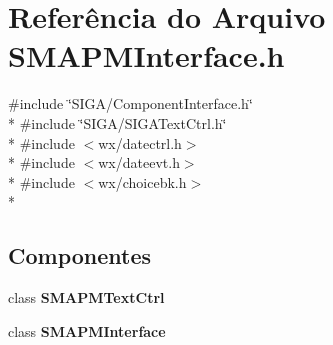 \section{Referência do Arquivo S\+M\+A\+P\+M\+Interface.\+h}
\label{_s_m_a_p_m_interface_8h}
{\ttfamily \#include \char`\"{}S\+I\+G\+A/\+Component\+Interface.\+h\char`\"{}}\\*
{\ttfamily \#include \char`\"{}S\+I\+G\+A/\+S\+I\+G\+A\+Text\+Ctrl.\+h\char`\"{}}\\*
{\ttfamily \#include $<$wx/datectrl.\+h$>$}\\*
{\ttfamily \#include $<$wx/dateevt.\+h$>$}\\*
{\ttfamily \#include $<$wx/choicebk.\+h$>$}\\*
\subsection*{Componentes}
\begin{DoxyCompactItemize}
\item 
class {\bf S\+M\+A\+P\+M\+Text\+Ctrl}
\item 
class {\bf S\+M\+A\+P\+M\+Interface}
\end{DoxyCompactItemize}
